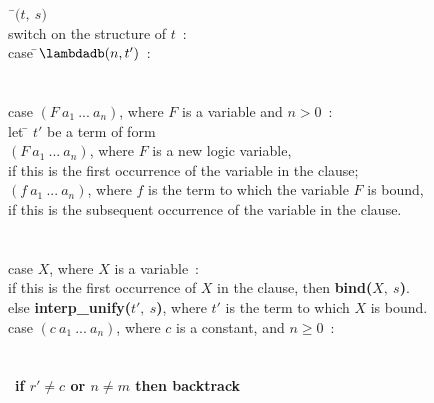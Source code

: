 \begin{figure}\footnotesize
\begin{tabbing}
\=\ $(t,\ ${\boldmath $s$}$)$  \\
                  \> switch on the structure of $t$\ : \\
                  \> case \=$\lambdadb(n, t')$\ : \\
                  \>        \\
                  \>       \\
                  \> case \>$(F\ a_1\ ...\ a_n)$, where $F$ is a variable and $n > 0$\ : \\
                  \>      \> let \= $t'$ be a term of form   \\
                  \>      \>     \> $(F\ a_1\ ...\ a_n)$, where $F$ is a new logic variable, \\
                  \>      \>     \> if this is the first occurrence of the variable in the clause;\\
                  \>      \>     \> $(f\ a_1\ ...\ a_n)$, where $f$ is the term to which the variable $F$ is bound, \\
                  \>      \>     \> if this is the subsequent occurrence of the variable in the clause. \\
                  \>       \\
                  \>       \\
                  \> case \>$X$, where $X$ is a variable\ : \\
                  \>      \>if this is the first occurrence of $X$ in the clause, then {\bf bind({\boldmath $X,\ s$})}. \\
                  \>      \>else {\bf interp\_unify({\boldmath $t',\ s$})}, where $t'$ is the term to which $X$ is bound. \\
                  \> case \>$(c\ a_1\ ...\ a_n)$, where $c$ is a constant, and $n \geq 0$\ : \\
                  \>       \\
                  \>       \\
                  \>      \ \={\bf if \boldmath $r' \neq c$ or \boldmath $n \neq m$ then backtrack} \\

\end{tabbing}
\end{figure}
